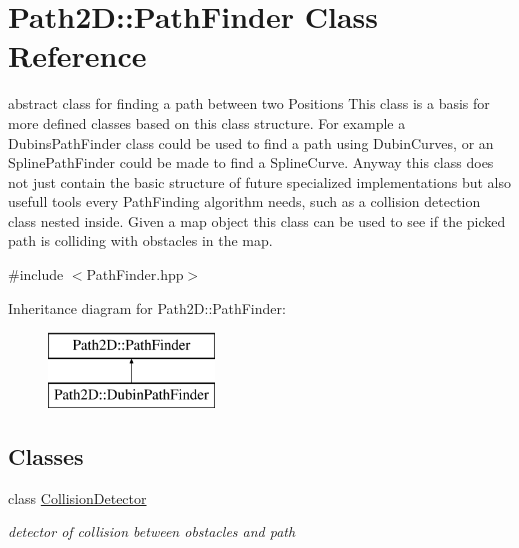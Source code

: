 \hypertarget{class_path2_d_1_1_path_finder}{}\section{Path2D\+:\+:Path\+Finder Class Reference}
\label{class_path2_d_1_1_path_finder}


abstract class for finding a path between two Positions  This class is a basis for more defined classes based on this class structure. For example a Dubins\+Path\+Finder class could be used to find a path using Dubin\+Curves, or an Spline\+Path\+Finder could be made to find a Spline\+Curve. Anyway this class does not just contain the basic structure of future specialized implementations but also usefull tools every Path\+Finding algorithm needs, such as a collision detection class nested inside. Given a map object this class can be used to see if the picked path is colliding with obstacles in the map.  




{\ttfamily \#include $<$Path\+Finder.\+hpp$>$}

Inheritance diagram for Path2D\+:\+:Path\+Finder\+:\begin{figure}[H]
\begin{center}
\leavevmode
\includegraphics[height=2.000000cm]{class_path2_d_1_1_path_finder}
\end{center}
\end{figure}
\subsection*{Classes}
\begin{DoxyCompactItemize}
\item 
class \mbox{\hyperlink{class_path2_d_1_1_path_finder_1_1_collision_detector}{Collision\+Detector}}
\begin{DoxyCompactList}\small\item\em detector of collision between obstacles and path \end{DoxyCompactList}\end{DoxyCompactItemize}
